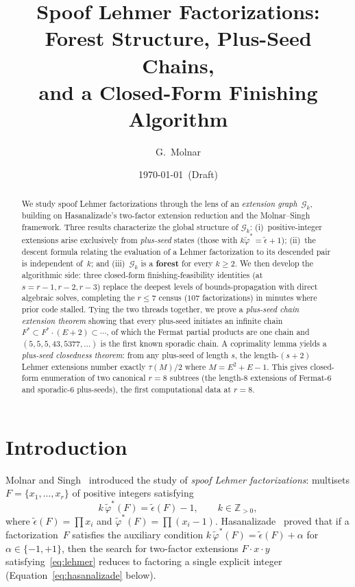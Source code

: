 \documentclass[11pt]{article}
\title{Spoof Lehmer Factorizations:\\
Forest Structure, Plus-Seed Chains,\\
and a Closed-Form Finishing Algorithm}
\author{G.\ Molnar}
\date{\today~(Draft)}
\theoremstyle{definition}
\theoremstyle{remark}
\newcommand{\eps}{\tilde{\epsilon}}
\newcommand{\phist}{\tilde{\varphi}^*}
\newcommand{\Z}{\mathbb{Z}}
\begin{document}
\maketitle

\begin{abstract}
We study spoof Lehmer factorizations through the lens of an
\emph{extension graph}~$\mathcal{G}_k$, building on Hasanalizade's
two-factor extension reduction and the Molnar--Singh framework.  Three
results characterize the global structure of $\mathcal{G}_k$:
(i)~positive-integer extensions arise exclusively from \emph{plus-seed}
states (those with $k\phist = \eps + 1$); (ii)~the descent formula
relating the evaluation of a Lehmer factorization to its descended
pair is independent of~$k$; and (iii)~$\mathcal{G}_k$ is a
\textbf{forest} for every $k \ge 2$.  We then develop the algorithmic
side: three closed-form finishing-feasibility identities (at
$s = r-1, r-2, r-3$) replace the deepest levels of bounds-propagation
with direct algebraic solves, completing the $r \le 7$ census ($107$
factorizations) in minutes where prior code stalled.  Tying the two
threads together, we prove a \emph{plus-seed chain extension theorem}
showing that every plus-seed initiates an infinite chain
$F^* \subset F^* \cdot (E + 2) \subset \cdots$, of which the Fermat
partial products are one chain and $(5, 5, 5, 43, 5377, \ldots)$ is the
first known sporadic chain.  A coprimality lemma yields a
\emph{plus-seed closedness theorem}: from any plus-seed of length $s$,
the length-$(s+2)$ Lehmer extensions number exactly $\tau(M)/2$ where
$M = E^2 + E - 1$.  This gives closed-form enumeration of two
canonical $r = 8$ subtrees (the length-8 extensions of Fermat-6 and
sporadic-6 plus-seeds), the first computational data at $r = 8$.
\end{abstract}


\section{Introduction}

Molnar and Singh~\cite{MS26} introduced the study of \emph{spoof Lehmer
factorizations}: multisets $F = \{x_1, \ldots, x_r\}$ of positive integers
satisfying
\begin{equation}\label{eq:lehmer}
  k\,\phist(F) = \eps(F) - 1,
  \qquad k \in \Z_{>0},
\end{equation}
where $\eps(F) = \prod x_i$ and $\phist(F) = \prod (x_i - 1)$.
Hasanalizade~\cite{H26} proved that if a factorization~$F$ satisfies the
auxiliary condition $k\,\phist(F) = \eps(F) + \alpha$ for
$\alpha \in \{-1, +1\}$, then the search for two-factor extensions
$F \cdot x \cdot y$ satisfying~\eqref{eq:lehmer} reduces to factoring a
single explicit integer (Equation~\eqref{eq:hasanalizade} below).
\end{document}
